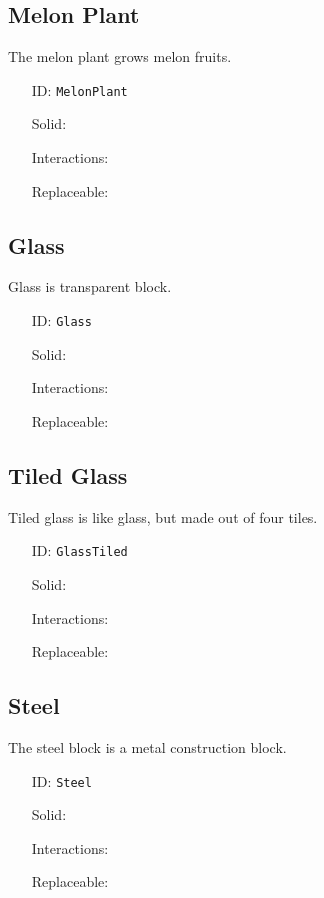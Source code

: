 \subsection{Melon Plant}\label{subsec:blocks_melon plant}
The melon plant grows melon fruits.
\newline
\begin{itemize}[nosep]
\item[ID:] \texttt{MelonPlant}
\item[Solid:]  \XSolidBrush \item[Interactions:]  \XSolidBrush \item[Replaceable:]  \XSolidBrush \end{itemize}

\subsection{Glass}\label{subsec:blocks_glass}
Glass is transparent block.
\newline
\begin{itemize}[nosep]
\item[ID:] \texttt{Glass}
\item[Solid:]  \Checkmark \item[Interactions:]  \XSolidBrush \item[Replaceable:]  \XSolidBrush \end{itemize}

\subsection{Tiled Glass}\label{subsec:blocks_tiled glass}
Tiled glass is like glass, but made out of four tiles.
\newline
\begin{itemize}[nosep]
\item[ID:] \texttt{GlassTiled}
\item[Solid:]  \Checkmark \item[Interactions:]  \XSolidBrush \item[Replaceable:]  \XSolidBrush \end{itemize}

\subsection{Steel}\label{subsec:blocks_steel}
The steel block is a metal construction block.
\newline
\begin{itemize}[nosep]
\item[ID:] \texttt{Steel}
\item[Solid:]  \Checkmark \item[Interactions:]  \XSolidBrush \item[Replaceable:]  \XSolidBrush \end{itemize}

